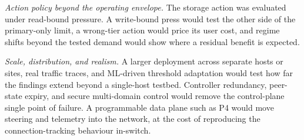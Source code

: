 ﻿\documentclass[12pt,reqno,twoside]{amsbook}
\begin{document}
\emph{Action policy beyond the operating envelope.} The storage action was
evaluated under read-bound pressure. A write-bound press would test the other
side of the primary-only limit, a wrong-tier action would price its user cost,
and regime shifts beyond the tested demand would show where a residual benefit
is expected.

\emph{Scale, distribution, and realism.} A larger deployment across separate
hosts or sites, real traffic traces, and ML-driven threshold adaptation would
test how far the findings extend beyond a single-host testbed. Controller
redundancy, peer-state expiry, and secure multi-domain control would remove the
control-plane single point of failure. A programmable data plane such as P4
would move steering and telemetry into the network, at the cost of reproducing
the connection-tracking behaviour in-switch.
\end{document}
